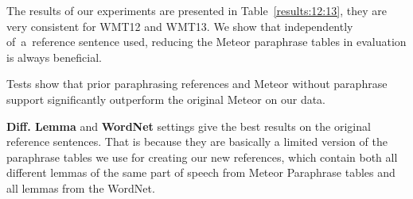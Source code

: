 \documentclass[11pt]{article}
\def\Tref#1{Table~\ref{#1}}
\begin{document}
\begin{table}[tb]
\begin{center}

\vspace{10pt}

\caption{Pearson's correlation of Meteor and the human judgment.}
\label{results:12:13}
\end{center}
\end{table}

The results of our experiments are presented in \Tref{results:12:13}, they are 
very consistent for WMT12 and WMT13. We show that independently of~a~reference 
sentence used, reducing the Meteor paraphrase tables in evaluation is always 
beneficial.

Tests show that prior paraphrasing references and Meteor without paraphrase
support significantly outperform the original Meteor on our data.

\textbf{Diff. Lemma} and \textbf{WordNet} settings give the best results on the 
original reference sentences. That is because they are basically a limited 
version of the paraphrase tables we use for creating our new references, which 
contain both all different lemmas of the same part of speech from Meteor 
Paraphrase tables and all lemmas from the WordNet.
\end{document}
